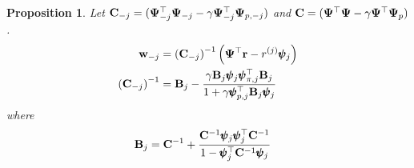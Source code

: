 \documentclass{article}
\newtheorem{proposition}{Proposition}
\begin{document}
\begin{proposition}
\label{prop:ls_fqe_influence}
Let $\mathbf{C}_{-j} = (\mathbf{\Psi}_{-j}^\top \mathbf{\Psi}_{-j} - \gamma \mathbf{\Psi}_{-j}^\top \mathbf{\Psi}_{p,-j})$ and $\mathbf{C} = (\mathbf{\Psi}^\top \mathbf{\Psi} - \gamma \mathbf{\Psi}^\top \mathbf{\Psi}_p)$.
\begin{align*}
    \mathbf{w}_{-j} &= \left(\mathbf{C}_{-j}\right)^{-1}\left( \mathbf{\Psi}^\top \mathbf{r} - r^{(j)} \pmb{\psi}_j \right)\\
    \left(\mathbf{C}_{-j}\right)^{-1} &= \mathbf{B}_{j} - \frac{\gamma \mathbf{B}_{j} \pmb{\psi}_j \pmb{\psi}_{\pi,j}^\top \mathbf{B}_{j}}{1+ \gamma \pmb{\psi}_{p,j}^{\top}\mathbf{B}_{j}\pmb{\psi}_{j}} \\
\end{align*}
where
\begin{align*}
    \mathbf{B}_{j} &= \mathbf{C}^{-1} + \frac{\mathbf{C}^{-1} \pmb{\psi}_j \pmb{\psi}_j^\top \mathbf{C}^{-1}}{1- \pmb{\psi}_{j}^{\top}\mathbf{C}^{-1}\pmb{\psi}_{j}}
\end{align*}
\end{proposition}
\end{document}
